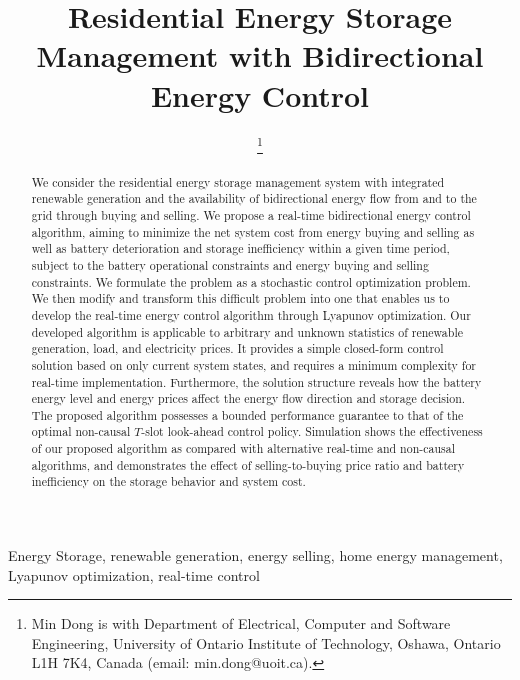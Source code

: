 \documentclass[journal]{IEEEtran}
\begin{document}
\title{Residential Energy Storage Management with Bidirectional Energy Control }
\author{
\thanks{Min Dong is with Department of Electrical, Computer and Software Engineering, University of Ontario Institute of Technology, Oshawa, Ontario L1H 7K4, Canada (email: min.dong@uoit.ca).}}
\maketitle


\begin{abstract}
We consider the residential energy storage management system with integrated renewable generation and the  availability of bidirectional energy flow from and to the grid through buying and selling. We  propose a real-time bidirectional energy control algorithm, aiming to minimize the net system cost from energy buying and selling as well as battery deterioration and storage inefficiency within a given time period, subject to the battery operational constraints and energy buying and selling constraints. We formulate the problem as a stochastic  control optimization problem. We then modify and transform this difficult problem into one that enables us to develop the real-time energy control algorithm through  Lyapunov optimization.
Our developed algorithm is applicable to arbitrary and unknown statistics of  renewable generation, load, and electricity prices. It provides a simple closed-form control solution based on only current system states, and requires a minimum complexity for real-time implementation. Furthermore, the   solution structure reveals how the battery energy level and energy prices  affect the energy flow direction and storage decision. The proposed algorithm possesses a bounded performance guarantee to that of the optimal non-causal $T$-slot look-ahead control policy.
Simulation shows the effectiveness of our proposed algorithm as compared with  alternative real-time and non-causal algorithms, and demonstrates the effect of selling-to-buying price ratio and battery inefficiency on the storage behavior and system cost.
\end{abstract}
\begin{IEEEkeywords}
Energy Storage, renewable generation, energy selling, home energy management, Lyapunov optimization, real-time control
\end{IEEEkeywords}
\end{document}
